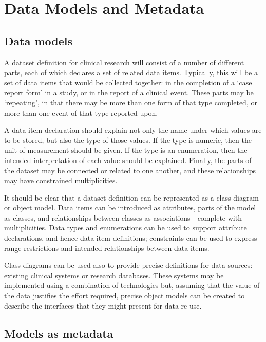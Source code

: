 \section{Data Models and Metadata}

\subsection{Data models}

A dataset definition for clinical research will consist of a number of
different parts, each of which declares a set of related data items.
Typically, this will be a set of data items that would be collected
together: in the completion of a `case report form' in a study, or in
the report of a clinical event.  These parts may be `repeating', in
that there may be more than one form of that type completed, or more
than one event of that type reported upon.  

A data item declaration should explain not only the name under which
values are to be stored, but also the type of those values.  If the
type is numeric, then the unit of measurement should be given.  If the
type is an enumeration, then the intended interpretation of each value
should be explained.  Finally, the parts of the dataset may be
connected or related to one another, and these relationships may have
constrained multiplicities.

It should be clear that a dataset definition can be represented as a
class diagram or object model.  Data items can be introduced as
attributes, parts of the model as classes, and relationships between
classes as associations---complete with multiplicities.  Data types
and enumerations can be used to support attribute declarations, and
hence data item definitions; constraints can be used to express range
restrictions and intended relationships between data items.

Class diagrams can be used also to provide precise definitions for
data sources: existing clinical systems or research databases.  These
systems may be implemented using a combination of technologies but,
assuming that the value of the data justifies the effort required,
precise object models can be created to describe the interfaces that
they might present for data re-use. 

\subsection{Models as metadata}

